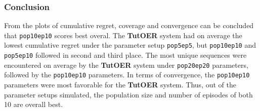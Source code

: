 \subsubsection*{Conclusion}
From the plots of cumulative regret, coverage and convergence can
be concluded that \texttt{pop10ep10} scores best overal. The \textbf{TutOER} system
had on average the lowest cumulative regret under the parameter setup
\texttt{pop5ep5}, but \texttt{pop10ep10} and \texttt{pop5ep10} followed in second and
third place. The most unique sequences were encountered on average by the
\textbf{TutOER} system under \texttt{pop20ep20} parameters, followed by the
\texttt{pop10ep10} parameters. In terms of convergence, the \texttt{pop10ep10} parameters
were most favorable for the \textbf{TutOER} system. Thus, out of the parameter
setups simulated, the population size and number of episodes of both 10 are
overall best.
